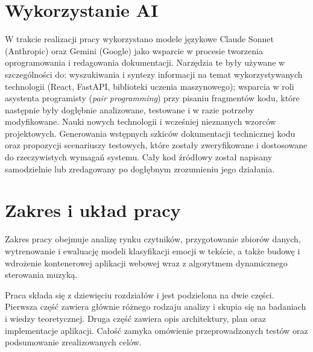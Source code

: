 \section{Wykorzystanie AI}
W trakcie realizacji pracy wykorzystano modele językowe Claude Sonnet (Anthropic) oraz Gemini (Google) jako wsparcie w procesie tworzenia oprogramowania i redagowania dokumentacji. Narzędzia te były używane w szczególności do: wyszukiwania i syntezy informacji na temat wykorzystywanych technologii (React, FastAPI, biblioteki uczenia maszynowego); wsparcia w roli asystenta programisty (\textit{pair programming}) przy pisaniu fragmentów kodu, które następnie były dogłębnie analizowane, testowane i w razie potrzeby modyfikowane. Nauki nowych technologii i wcześniej nieznanych wzorców projektowych. Generowania wstępnych szkiców dokumentacji technicznej kodu oraz propozycji scenariuszy testowych, które zostały zweryfikowane i dostosowane do rzeczywistych wymagań systemu. Cały kod źródłowy został napisany samodzielnie lub zredagowany po dogłębnym zrozumieniu jego działania.

\section{Zakres i układ pracy}
Zakres pracy obejmuje analizę rynku czytników, przygotowanie zbiorów
danych, wytrenowanie i ewaluację modeli klasyfikacji emocji w tekście, a
także budowę i wdrożenie kontenerowej aplikacji webowej wraz z algorytmem dynamicznego sterowania 
muzyką.

Praca składa się z dziewięciu rozdziałów i jest podzielona na dwie części. Pierwsza część zawiera
głównie różnego rodzaju analizy i skupia się na badaniach i wiedzy teoretycznej. Druga część zawiera
opis architektury, plan oraz implementacje aplikacji. Całość zamyka omówienie przeprowadzonych 
testów oraz podsumowanie zrealizowanych celów.


